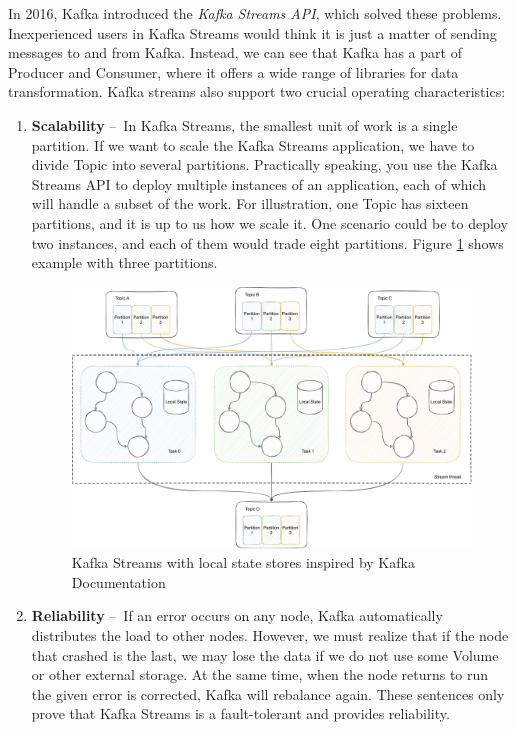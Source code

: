 In 2016, Kafka introduced the \emph{Kafka Streams API}, which solved these problems. Inexperienced users in Kafka Streams would think it is just a matter of sending messages to and from Kafka. Instead, we can see that Kafka has a part of Producer and Consumer, where it offers a wide range of libraries for data transformation. Kafka streams also support two crucial operating characteristics:
\begin{enumerate}[itemsep=1mm, parsep=0pt]
    \item \textbf{Scalability} \---\ In Kafka Streams, the smallest unit of work is a single partition. If we want to scale the Kafka Streams application, we have to divide Topic into several partitions. Practically speaking, you use the Kafka Streams API to deploy multiple instances of an application, each of which will handle a subset of the work. For illustration, one Topic has sixteen partitions, and it is up to us how we scale it. One scenario could be to deploy two instances, and each of them would trade eight partitions. Figure \ref{fig:kafkaStreams} shows example with three partitions.
    
    \begin{figure}[!h]
    \centering
    \includegraphics[scale=0.48]{obrazky-figures/02-preliminaries/02-kafka/07-kafka-streams-with-localstate,thread.pdf}
    \caption{Kafka Streams with local state stores inspired by Kafka Documentation \cite{kafkaDocumentation}}
    \label{fig:kafkaStreams}
    \end{figure}
    
    
    \item \textbf{Reliability} \---\ If an error occurs on any node, Kafka automatically distributes the load to other nodes. However, we must realize that if the node that crashed is the last, we may lose the data if we do not use some Volume or other external storage. At the same time, when the node returns to run the given error is corrected, Kafka will rebalance again. These sentences only prove that Kafka Streams is a fault-tolerant and provides reliability.
\end{enumerate}

